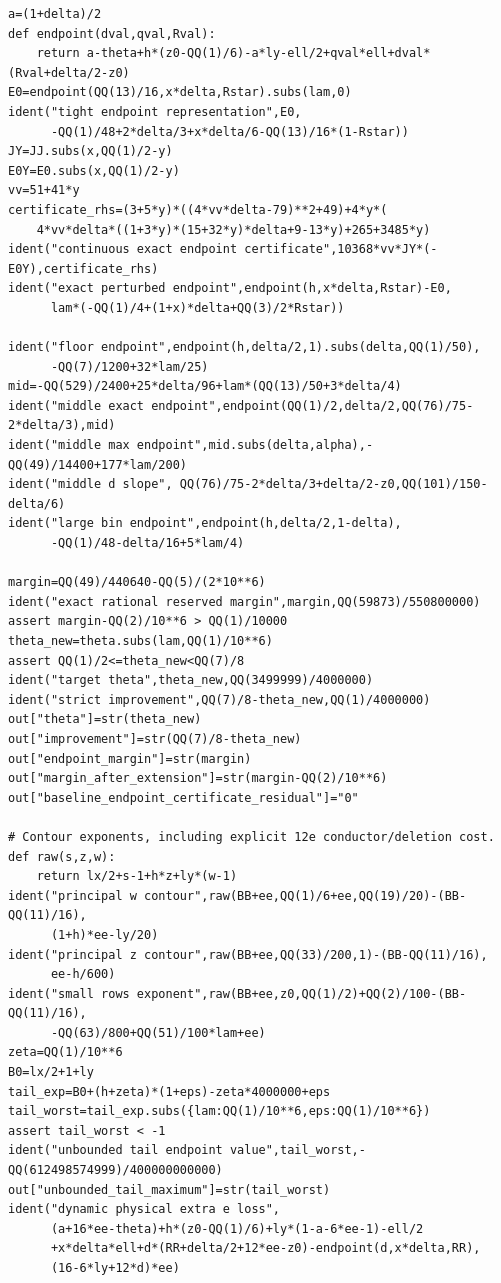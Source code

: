 \documentclass[12pt]{article}
\begin{document}
\begin{verbatim}
a=(1+delta)/2
def endpoint(dval,qval,Rval):
    return a-theta+h*(z0-QQ(1)/6)-a*ly-ell/2+qval*ell+dval*(Rval+delta/2-z0)
E0=endpoint(QQ(13)/16,x*delta,Rstar).subs(lam,0)
ident("tight endpoint representation",E0,
      -QQ(1)/48+2*delta/3+x*delta/6-QQ(13)/16*(1-Rstar))
JY=JJ.subs(x,QQ(1)/2-y)
E0Y=E0.subs(x,QQ(1)/2-y)
vv=51+41*y
certificate_rhs=(3+5*y)*((4*vv*delta-79)**2+49)+4*y*(
    4*vv*delta*((1+3*y)*(15+32*y)*delta+9-13*y)+265+3485*y)
ident("continuous exact endpoint certificate",10368*vv*JY*(-E0Y),certificate_rhs)
ident("exact perturbed endpoint",endpoint(h,x*delta,Rstar)-E0,
      lam*(-QQ(1)/4+(1+x)*delta+QQ(3)/2*Rstar))

ident("floor endpoint",endpoint(h,delta/2,1).subs(delta,QQ(1)/50),
      -QQ(7)/1200+32*lam/25)
mid=-QQ(529)/2400+25*delta/96+lam*(QQ(13)/50+3*delta/4)
ident("middle exact endpoint",endpoint(QQ(1)/2,delta/2,QQ(76)/75-2*delta/3),mid)
ident("middle max endpoint",mid.subs(delta,alpha),-QQ(49)/14400+177*lam/200)
ident("middle d slope", QQ(76)/75-2*delta/3+delta/2-z0,QQ(101)/150-delta/6)
ident("large bin endpoint",endpoint(h,delta/2,1-delta),
      -QQ(1)/48-delta/16+5*lam/4)

margin=QQ(49)/440640-QQ(5)/(2*10**6)
ident("exact rational reserved margin",margin,QQ(59873)/550800000)
assert margin-QQ(2)/10**6 > QQ(1)/10000
theta_new=theta.subs(lam,QQ(1)/10**6)
assert QQ(1)/2<=theta_new<QQ(7)/8
ident("target theta",theta_new,QQ(3499999)/4000000)
ident("strict improvement",QQ(7)/8-theta_new,QQ(1)/4000000)
out["theta"]=str(theta_new)
out["improvement"]=str(QQ(7)/8-theta_new)
out["endpoint_margin"]=str(margin)
out["margin_after_extension"]=str(margin-QQ(2)/10**6)
out["baseline_endpoint_certificate_residual"]="0"

# Contour exponents, including explicit 12e conductor/deletion cost.
def raw(s,z,w):
    return lx/2+s-1+h*z+ly*(w-1)
ident("principal w contour",raw(BB+ee,QQ(1)/6+ee,QQ(19)/20)-(BB-QQ(11)/16),
      (1+h)*ee-ly/20)
ident("principal z contour",raw(BB+ee,QQ(33)/200,1)-(BB-QQ(11)/16),
      ee-h/600)
ident("small rows exponent",raw(BB+ee,z0,QQ(1)/2)+QQ(2)/100-(BB-QQ(11)/16),
      -QQ(63)/800+QQ(51)/100*lam+ee)
zeta=QQ(1)/10**6
B0=lx/2+1+ly
tail_exp=B0+(h+zeta)*(1+eps)-zeta*4000000+eps
tail_worst=tail_exp.subs({lam:QQ(1)/10**6,eps:QQ(1)/10**6})
assert tail_worst < -1
ident("unbounded tail endpoint value",tail_worst,-QQ(612498574999)/400000000000)
out["unbounded_tail_maximum"]=str(tail_worst)
ident("dynamic physical extra e loss",
      (a+16*ee-theta)+h*(z0-QQ(1)/6)+ly*(1-a-6*ee-1)-ell/2
      +x*delta*ell+d*(RR+delta/2+12*ee-z0)-endpoint(d,x*delta,RR),
      (16-6*ly+12*d)*ee)


\end{verbatim}
\end{document}
